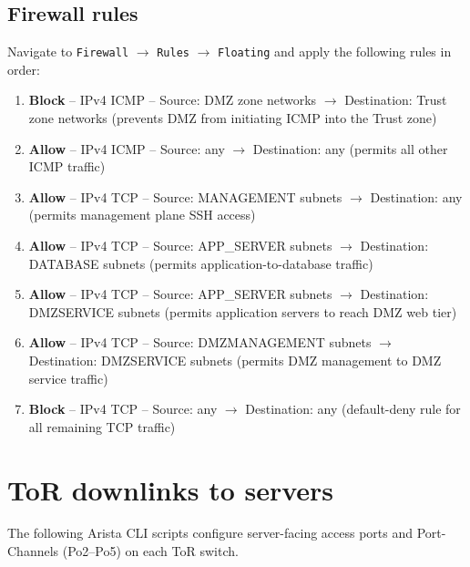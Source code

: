 \subsection{Firewall rules}

Navigate to \texttt{Firewall} $\rightarrow$ \texttt{Rules} $\rightarrow$ \texttt{Floating} and apply the following rules in order:

\begin{enumerate}[nosep]
    \item \textbf{Block} -- IPv4 ICMP -- Source: DMZ zone networks $\rightarrow$ Destination: Trust zone networks (prevents DMZ from initiating ICMP into the Trust zone)
    \item \textbf{Allow} -- IPv4 ICMP -- Source: any $\rightarrow$ Destination: any (permits all other ICMP traffic)
    \item \textbf{Allow} -- IPv4 TCP -- Source: MANAGEMENT subnets $\rightarrow$ Destination: any (permits management plane SSH access)
    \item \textbf{Allow} -- IPv4 TCP -- Source: APP\_SERVER subnets $\rightarrow$ Destination: DATABASE subnets (permits application-to-database traffic)
    \item \textbf{Allow} -- IPv4 TCP -- Source: APP\_SERVER subnets $\rightarrow$ Destination: DMZSERVICE subnets (permits application servers to reach DMZ web tier)
    \item \textbf{Allow} -- IPv4 TCP -- Source: DMZMANAGEMENT subnets $\rightarrow$ Destination: DMZSERVICE subnets (permits DMZ management to DMZ service traffic)
    \item \textbf{Block} -- IPv4 TCP -- Source: any $\rightarrow$ Destination: any (default-deny rule for all remaining TCP traffic)
\end{enumerate}

\section{ToR downlinks to servers}

The following Arista CLI scripts configure server-facing access ports and Port-Channels (Po2--Po5) on each ToR switch.

